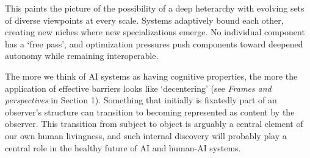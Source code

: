 \documentclass[11pt]{article}
\begin{document}
This paints the picture of the possibility of a deep heterarchy with evolving sets of diverse viewpoints at every scale. Systems adaptively bound each other, creating new niches where new specializations emerge. No individual component has a `free pass', and optimization pressures push components toward deepened autonomy while remaining interoperable.


The more we think of AI systems as having cognitive properties, the more the application of effective barriers looks like `decentering' (see \textit{Frames and perspectives} in Section 1). Something that initially is fixatedly part of an observer's structure can transition to becoming represented as content by the observer. This transition from subject to object is arguably a central element of our own human livingness, and such internal discovery will probably play a central role in the healthy future of AI and human-AI systems.









\end{document}
